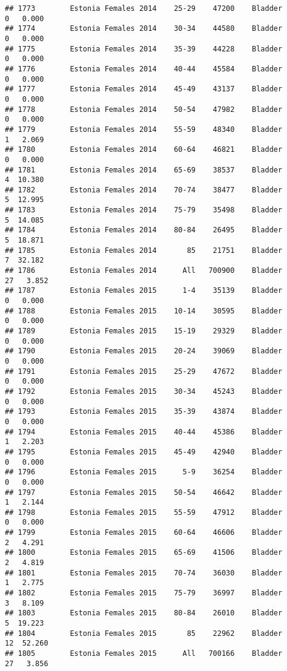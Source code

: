 \documentclass[
]{article}
\begin{document}
\begin{verbatim}
## 1773        Estonia Females 2014    25-29    47200    Bladder      0   0.000
## 1774        Estonia Females 2014    30-34    44580    Bladder      0   0.000
## 1775        Estonia Females 2014    35-39    44228    Bladder      0   0.000
## 1776        Estonia Females 2014    40-44    45584    Bladder      0   0.000
## 1777        Estonia Females 2014    45-49    43137    Bladder      0   0.000
## 1778        Estonia Females 2014    50-54    47982    Bladder      0   0.000
## 1779        Estonia Females 2014    55-59    48340    Bladder      1   2.069
## 1780        Estonia Females 2014    60-64    46821    Bladder      0   0.000
## 1781        Estonia Females 2014    65-69    38537    Bladder      4  10.380
## 1782        Estonia Females 2014    70-74    38477    Bladder      5  12.995
## 1783        Estonia Females 2014    75-79    35498    Bladder      5  14.085
## 1784        Estonia Females 2014    80-84    26495    Bladder      5  18.871
## 1785        Estonia Females 2014       85    21751    Bladder      7  32.182
## 1786        Estonia Females 2014      All   700900    Bladder     27   3.852
## 1787        Estonia Females 2015      1-4    35139    Bladder      0   0.000
## 1788        Estonia Females 2015    10-14    30595    Bladder      0   0.000
## 1789        Estonia Females 2015    15-19    29329    Bladder      0   0.000
## 1790        Estonia Females 2015    20-24    39069    Bladder      0   0.000
## 1791        Estonia Females 2015    25-29    47672    Bladder      0   0.000
## 1792        Estonia Females 2015    30-34    45243    Bladder      0   0.000
## 1793        Estonia Females 2015    35-39    43874    Bladder      0   0.000
## 1794        Estonia Females 2015    40-44    45386    Bladder      1   2.203
## 1795        Estonia Females 2015    45-49    42940    Bladder      0   0.000
## 1796        Estonia Females 2015      5-9    36254    Bladder      0   0.000
## 1797        Estonia Females 2015    50-54    46642    Bladder      1   2.144
## 1798        Estonia Females 2015    55-59    47912    Bladder      0   0.000
## 1799        Estonia Females 2015    60-64    46606    Bladder      2   4.291
## 1800        Estonia Females 2015    65-69    41506    Bladder      2   4.819
## 1801        Estonia Females 2015    70-74    36030    Bladder      1   2.775
## 1802        Estonia Females 2015    75-79    36997    Bladder      3   8.109
## 1803        Estonia Females 2015    80-84    26010    Bladder      5  19.223
## 1804        Estonia Females 2015       85    22962    Bladder     12  52.260
## 1805        Estonia Females 2015      All   700166    Bladder     27   3.856

\end{verbatim}
\end{document}
